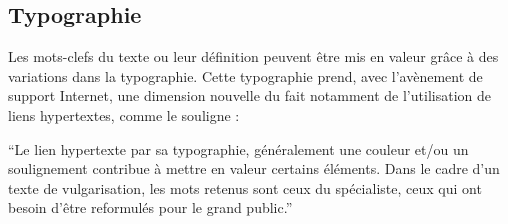 \documentclass[a4paper,10pt]{article}
\begin{document}
	\subsection{Typographie} \label{typo}
		Les mots-clefs du texte ou leur définition peuvent être mis en valeur grâce à des variations dans la typographie. Cette typographie prend, avec l'avènement de support Internet, une dimension nouvelle du fait notamment de l'utilisation de liens hypertextes, comme le souligne \cite{Toure2004} :
		\begin{center}
			\footnotesize
			\begin{minipage}{0.7\textwidth}
				``Le lien hypertexte par sa typographie, généralement une couleur et/ou
				un soulignement contribue à mettre en valeur certains éléments. Dans le cadre d’un texte de vulgarisation, les mots retenus sont ceux du spécialiste, ceux qui ont besoin d’être reformulés pour le grand public.''
			\end{minipage}
		\end{center}
\end{document}
